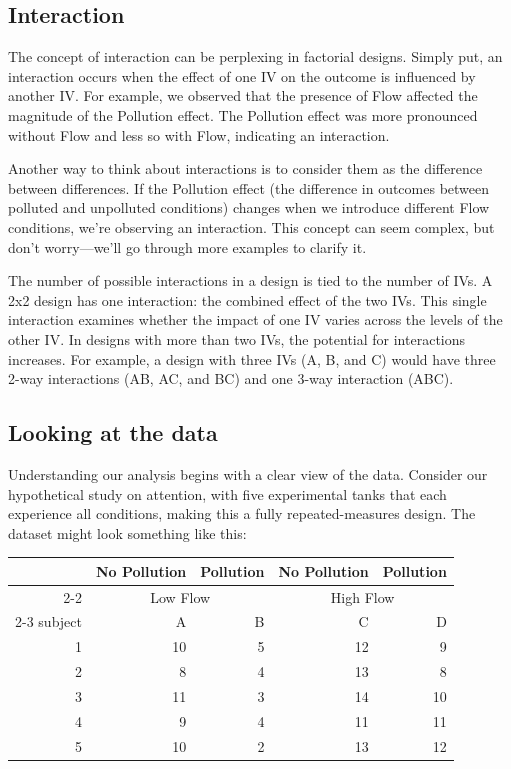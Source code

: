 \documentclass[
  letterpaper,
  DIV=11,
  numbers=noendperiod]{scrreprt}
\begin{document}
\subsection{Interaction}\label{interaction}

The concept of interaction can be perplexing in factorial designs.
Simply put, an interaction occurs when the effect of one IV on the
outcome is influenced by another IV. For example, we observed that the
presence of Flow affected the magnitude of the Pollution effect. The
Pollution effect was more pronounced without Flow and less so with Flow,
indicating an interaction.

Another way to think about interactions is to consider them as the
difference between differences. If the Pollution effect (the difference
in outcomes between polluted and unpolluted conditions) changes when we
introduce different Flow conditions, we're observing an interaction.
This concept can seem complex, but don't worry---we'll go through more
examples to clarify it.

The number of possible interactions in a design is tied to the number of
IVs. A 2x2 design has one interaction: the combined effect of the two
IVs. This single interaction examines whether the impact of one IV
varies across the levels of the other IV. In designs with more than two
IVs, the potential for interactions increases. For example, a design
with three IVs (A, B, and C) would have three 2-way interactions (AB,
AC, and BC) and one 3-way interaction (ABC).

\subsection{Looking at the data}\label{looking-at-the-data-1}

Understanding our analysis begins with a clear view of the data.
Consider our hypothetical study on attention, with five experimental
tanks that each experience all conditions, making this a fully
repeated-measures design. The dataset might look something like this:

\begin{table}
\centering
\begin{tabular}{r|r|r|r|r}
\hline
\multicolumn{1}{c|}{ } & \multicolumn{1}{c|}{No Pollution} & \multicolumn{1}{c|}{Pollution} & \multicolumn{1}{c|}{No Pollution} & \multicolumn{1}{c}{Pollution} \\
\cline{2-2} \cline{3-3} \cline{4-4} \cline{5-5}
\multicolumn{1}{c|}{ } & \multicolumn{2}{c|}{Low Flow} & \multicolumn{2}{c}{High Flow} \\
\cline{2-3} \cline{4-5}
subject & A & B & C & D\\
\hline
1 & 10 & 5 & 12 & 9\\
\hline
2 & 8 & 4 & 13 & 8\\
\hline
3 & 11 & 3 & 14 & 10\\
\hline
4 & 9 & 4 & 11 & 11\\
\hline
5 & 10 & 2 & 13 & 12\\
\hline
\end{tabular}
\end{table}
\end{document}
